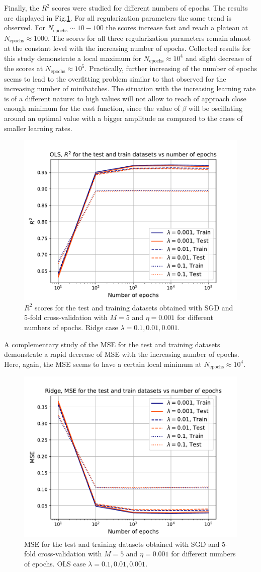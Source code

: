 \documentclass{emulateapj}
\begin{document}
Finally, the $R^2$ scores were studied for different numbers of epochs. The results are displayed in Fig.\ref{fig: R2_Ridge_epochs}. For all regularization parameters the same trend is observed. For  $N_{\mathrm{epochs}}\sim 10-100$ the scores increase fast and reach a plateau at $N_{\mathrm{epochs}}\approx 1000$. The scores for all three regularization parameters remain almost at the constant level with the increasing number of epochs. Collected results for this study demonstrate a local maximum for $N_{\mathrm{epochs}}\approx10^4$ and slight decrease of the scores at $N_{\mathrm{epochs}}\approx10^5$. Practically, further increasing of the number of epochs seems to lead to the overfitting problem similar to that observed for the increasing number of minibatches. The situation with the increasing learning rate is of a different nature: to high values will not allow to reach of approach close enough minimum for the cost function, since the value of $\beta$ will be oscillating around an optimal value with a bigger amplitude as compared to the cases of smaller learning rates. 

\begin{figure}[h]
    \centering
    \includegraphics[width=.49\textwidth]{Figures/Ridge_R2_epochs.pdf}
    \caption{$R^2$ scores for the test and training datasets obtained with SGD and 5-fold cross-validation with $M=5$ and $\eta=0.001$ for different numbers of epochs. Ridge case $\lambda=0.1,0.01,0.001$.}
    \label{fig: R2_Ridge_epochs}
\end{figure}

A complementary study of the MSE for the test and training datasets demonstrate a rapid decrease of MSE with the increasing number of epochs. Here, again, the MSE seems to have a certain local minimum at $N_{\mathrm{epochs}}\approx10^4$. 

\begin{figure}[h]
    \centering
    \includegraphics[width=.49\textwidth]{Figures/Ridge_MSE_epochs.pdf}
    \caption{MSE for the test and training datasets obtained with SGD and 5-fold cross-validation with $M=5$ and $\eta=0.001$ for different numbers of epochs. OLS case $\lambda=0.1,0.01,0.001$.}
    \label{fig: MSE_Ridge_epochs}
\end{figure}
\end{document}
